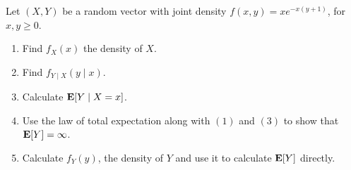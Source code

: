 \documentclass[11pt,a4paper]{article}
\begin{document}
\begin{exercise}
  Let $(X,Y)$ be a random vector with joint density $f(x,y) = x e^{-x(y + 1)}$,
  for $x,y \geq 0$.
  \begin{enumerate}
    \item[(1)] Find $f_X(x)$ the density of $X$.
    \item[(2)] Find $f_{Y \mid X}(y \mid x)$.
    \item[(3)] Calculate $\mathbf{E}[Y \mid X = x]$.
    \item[(4)] Use the law of total expectation along with $(1)$
      and $(3)$ to show that $\mathbf{E}[Y] = \infty$.
    \item[(5)] Calculate $f_Y(y)$, the density of $Y$ and use it to calculate
      $\mathbf{E}[Y]$ directly.
  \end{enumerate}
\end{exercise}
\end{document}
